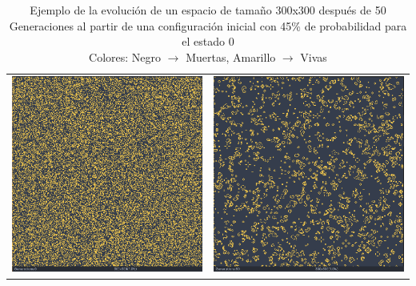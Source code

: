 \documentclass[]{article}
\begin{document}
\begin{landscape}
			\newpage
			\hfill \break
			\hfill \break
			\hfill \break
			\hfill \break
			\hfill \break
			\hfill \break
			\hfill \break
			\begin{table}[!h]
				\centering
				\begin{tabular}{c c}
					\includegraphics[width=11cm]{Imagenes/Evolucion_300x300_0Gen.png} &
					\includegraphics[width=11cm]{Imagenes/Evolucion_300x300_50Gen.png}
				\end{tabular}
				\caption{Ejemplo de la evolución de un espacio de tamaño 300x300 después de 50 Generaciones al partir de una configuración inicial con 45\% de probabilidad para el estado 0 \\ Colores: Negro $\rightarrow$ Muertas, Amarillo $\rightarrow$ Vivas}
				\label{Evolucion_300x300}
			\end{table}
		

\end{landscape}
\end{document}
